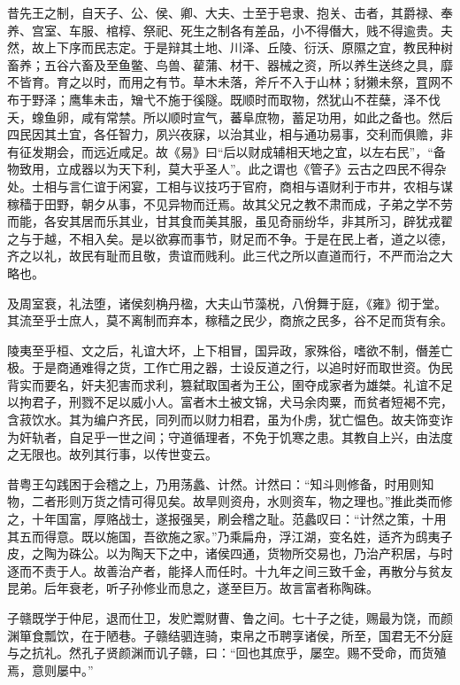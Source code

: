 \documentclass[12pt,UTF8]{ctexbook}
\begin{document}
昔先王之制，自天子、公、侯、卿、大夫、士至于皂隶、抱关、击者，其爵禄、奉养、宫室、车服、棺椁、祭祀、死生之制各有差品，小不得僭大，贱不得逾贵。夫然，故上下序而民志定。于是辩其土地、川泽、丘陵、衍沃、原隰之宜，教民种树畜养；五谷六畜及至鱼鳖、鸟兽、雚蒲、材干、器械之资，所以养生送终之具，靡不皆育。育之以时，而用之有节。草木未落，斧斤不入于山林；豺獭未祭，罝网不布于野泽；鹰隼未击，矰弋不施于徯隧。既顺时而取物，然犹山不茬蘖，泽不伐夭，蟓鱼卵，咸有常禁。所以顺时宣气，蕃阜庶物，蓄足功用，如此之备也。然后四民因其土宜，各任智力，夙兴夜寐，以治其业，相与通功易事，交利而俱赡，非有征发期会，而远近咸足。故《易》曰“后以财成辅相天地之宜，以左右民”，“备物致用，立成器以为天下利，莫大乎圣人”。此之谓也《管子》云古之四民不得杂处。士相与言仁谊于闲宴，工相与议技巧于官府，商相与语财利于市井，农相与谋稼穑于田野，朝夕从事，不见异物而迁焉。故其父兄之教不肃而成，子弟之学不劳而能，各安其居而乐其业，甘其食而美其服，虽见奇丽纷华，非其所习，辟犹戎翟之与于越，不相入矣。是以欲寡而事节，财足而不争。于是在民上者，道之以德，齐之以礼，故民有耻而且敬，贵谊而贱利。此三代之所以直道而行，不严而治之大略也。



及周室衰，礼法堕，诸侯刻桷丹楹，大夫山节藻棁，八佾舞于庭，《雍》彻于堂。其流至乎士庶人，莫不离制而弃本，稼穑之民少，商旅之民多，谷不足而货有余。



陵夷至乎桓、文之后，礼谊大坏，上下相冒，国异政，家殊俗，嗜欲不制，僭差亡极。于是商通难得之货，工作亡用之器，士设反道之行，以追时好而取世资。伪民背实而要名，奸夫犯害而求利，篡弑取国者为王公，圉夺成家者为雄桀。礼谊不足以拘君子，刑戮不足以威小人。富者木土被文锦，犬马余肉粟，而贫者短褐不完，含菽饮水。其为编户齐民，同列而以财力相君，虽为仆虏，犹亡愠色。故夫饰变诈为奸轨者，自足乎一世之间；守道循理者，不免于饥寒之患。其教自上兴，由法度之无限也。故列其行事，以传世变云。



昔粤王勾践困于会稽之上，乃用荡蠡、计然。计然曰：“知斗则修备，时用则知物，二者形则万货之情可得见矣。故旱则资舟，水则资车，物之理也。”推此类而修之，十年国富，厚赂战士，遂报强吴，刷会稽之耻。范蠡叹曰：“计然之策，十用其五而得意。既以施国，吾欲施之家。”乃乘扁舟，浮江湖，变名姓，适齐为鸱夷子皮，之陶为硃公。以为陶天下之中，诸侯四通，货物所交易也，乃治产积居，与时逐而不责于人。故善治产者，能择人而任时。十九年之间三致千金，再散分与贫友昆弟。后年衰老，听子孙修业而息之，遂至巨万。故言富者称陶硃。



子赣既学于仲尼，退而仕卫，发贮鬻财曹、鲁之间。七十子之徒，赐最为饶，而颜渊箪食瓢饮，在于陋巷。子赣结驷连骑，束帛之币聘享诸侯，所至，国君无不分庭与之抗礼。然孔子贤颜渊而讥子赣，曰：“回也其庶乎，屡空。赐不受命，而货殖焉，意则屡中。”
\end{document}
